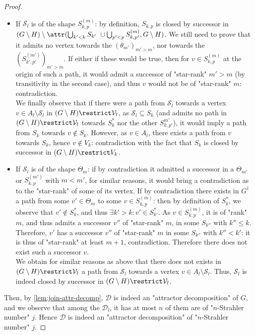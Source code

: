 \documentclass[a4paper,UKenglish,cleveref, autoref, thm-restate]{lipics-v2021}
\newcommand{\A}{{A}}
\newcommand{\D}{\mathcal{D}}
\renewcommand{\S}{\mathcal{S}}
\newcommand{\V}{\mathcal{V}}
\renewcommand{\leq}{\leqslant}
\begin{document}
\begin{proof}
	\begin{itemize}
		\item If $\S_l$ is of the shape $S^{(m)}_{k,p}$: by definition, $S_{k,p}$ is closed by successor in $(G\setminus H)\setminus \attr(\bigcup_{k'<k} S_{k'}\ \cup \bigcup_{p'<p}S^{(m)}_{k,p'}, G\setminus H)$. We still need to prove that it admits no vertex towards the $(\theta_{m'})_{m'>m}$, nor towards the $(S^{(m')}_{k',p'})_{m'>m}$. If either if these would be true, then for $v\in S^{(m)}_{k,p}$ at the origin of such a path, it would admit a successor of "star-rank" $m'>m$ (by transitivity in the second case), and thus $v$ would not be of "star-rank" $m$: contradiction.\\
		We finally observe that if there were a path from $\S_l$ towards a vertex $v \in \A_l \setminus \S_l$ in $(G \setminus H) \restrict \V_l$, as $\S_l \subseteq S_k$ (and admits no path in $(G \setminus H) \restrict \V_l$ towards $S^*_k$ nor the other $S^{m'}_{k,p'}$), it would imply a path from $S_k$ towards $v\notin S_k$. However, as $v\in \A_l$, there exists a path from $v$ towards $S_k$, hence $v \notin V_k$: contradiction with the fact that $S_k$ is closed by successor in $(G\setminus H)\restrict V_k$.
		\item If $\S_l$ is of the shape $\Theta_m$: if by contradiction it admitted a successor in a $\Theta_{m'}$ or $S^{(m')}_{k,p}$ with $m<m'$, for similar reasons, it would bring a contradiction as to the "star-rank" of some of its vertex. If by contradiction there exists in $G^\dagger$ a path from some $v'\in \Theta_m$ to some $v \in S^{(m)}_{k,p}$: then by definition of $S^*_k$, we observe that $v'\notin S^*_k$, and thus $\exists k' > k: v'\in S^*_{k'}$. As $v\in S^{(m)}_{k,p}$, it is of "rank" $m$, and thus admits a successor $v''$ of "star-rank" $m$, in some $S_{k''}$ with $ k'' \leq k$. Therefore, $v'$ has a successor $v''$ of "star-rank" $m$ in some $S_{k''}$ with $k'' < k'$: it is thus of "star-rank" at least $m+1$, contradiction. Therefore there does not exist such a successor $v$.\\
		We obtain for similar reasons as above that there does not exists in $(G \setminus H) \restrict \V_l$ a path from $\S_l$ towards a vertex $v \in \A_l \setminus \S_l$. Thus, $\S_l$ is indeed closed by successor in $(G\setminus H)\restrict \V_l$.
	\end{itemize}
	Then, by \cref{lem:join-attr-decomp}, $\D$ is indeed an "attractor decomposition" of $G$, and we observe that among the $\D_l$, it has at most $n$ of them are of "$n$-Strahler number" $j$. Hence $\D$ is indeed an "attractor decomposition" of "$n$-Strahler number" $j$.
\end{proof}
\end{document}
